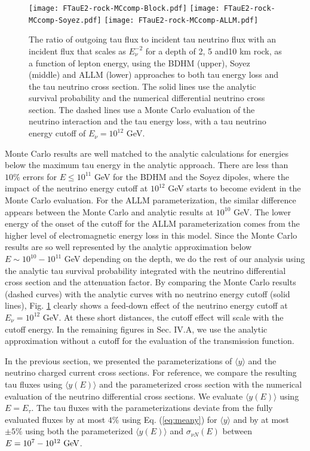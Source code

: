 \documentclass[aps,10pt,twocolumn,tightenlines]{revtex4-1}
\begin{document}
\begin{figure}[htb]
\centering
	\texttt{[image: FTauE2-rock-MCcomp-Block.pdf]}
	\texttt{[image: FTauE2-rock-MCcomp-Soyez.pdf]}
	\texttt{[image: FTauE2-rock-MCcomp-ALLM.pdf]}	
	\caption{The ratio of outgoing tau flux to incident tau neutrino flux with an incident flux that scales as $E_\nu^{-2}$ for a depth of 2, 5 and10 km rock, as a function of lepton energy, using the BDHM (upper), Soyez (middle) and ALLM (lower) approaches to both tau energy loss and the tau neutrino cross section. The solid lines use the analytic survival probability and the numerical differential neutrino cross section. The dashed lines use a Monte Carlo evaluation of the neutrino interaction and the tau energy loss, with a tau
neutrino energy cutoff of $E_\nu=10^{12}$ GeV.}
\label{fig:flux-diffuse-mc}
\end{figure}

Monte Carlo results are well matched to the analytic calculations for energies below the maximum tau energy in the analytic
approach. There are
less than $10 \%$ errors for $E \leq 10^{11}$ GeV for the BDHM and the Soyez dipoles, where the impact of the
neutrino energy cutoff at $10^{12}$ GeV starts to become evident in the Monte Carlo evaluation. 
For the ALLM parameterization, the similar difference appears between the Monte Carlo and analytic
results at $10^{10}$ GeV. The lower energy of the onset of the cutoff for the ALLM parameterization comes from the higher level of electromagnetic energy loss in this model. Since the Monte Carlo results are so well represented by the 
analytic approximation below $E\sim 10^{10}-10^{11}$ GeV depending on the depth, we do the rest of our analysis using the analytic tau survival probability integrated with
the neutrino differential cross section and the attenuation factor. 
By comparing the Monte Carlo results (dashed curves) with the analytic curves with no neutrino energy cutoff (solid lines), Fig. \ref{fig:flux-diffuse-mc} clearly shows a feed-down effect of the neutrino energy cutoff at $E_\nu=10^{12}$ GeV. At these short distances, the cutoff
effect will scale with the cutoff energy. In the remaining figures in Sec. IV.A, we use the analytic approximation without a cutoff for the
evaluation of the transmission function.

In the previous section, we presented the parameterizations of $\langle y \rangle$ 
and the neutrino charged current cross sections. For reference, we compare the resulting tau fluxes
using $\langle y(E)\rangle$ and the parameterized cross section with the numerical evaluation of the neutrino
differential cross sections. We evaluate $\langle y (E)\rangle $ using $E=E_\tau$.
The tau fluxes with the parameterizations deviate from the fully evaluated fluxes by at most $4 \%$ using Eq. (\ref{eq:meany}) for 
$\langle y \rangle$ and  by at most $ \pm 5 \%$ using both the parameterized $\langle y(E)\rangle$ and $\sigma_{\nu N}(E)$  
between $E =10^7 - 10^{12} \ {\rm GeV}$.
\end{document}
